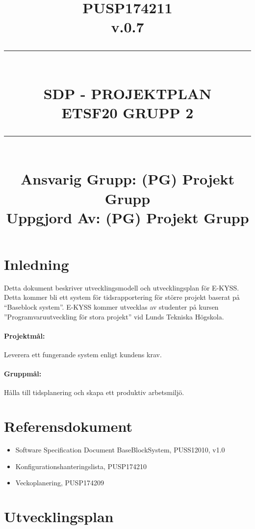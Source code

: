 \documentclass[paper=a4, fontsize=11pt,twoside]{article}
\title{
		\documentNumber{#1}																						
		\documentVersion{#2}																				
		\HRule{0.5pt} \\ %
		\LARGE \textbf{\uppercase{#3}} \\
		\large \textbf{\uppercase{ETSF20 Grupp 2}} 
		\HRule{2pt} \\ [1.5cm]    
		\normalsize            
		\documentResponsible{#4} \\ 
		\documentCreator{#4}  
	}
\newcommand{\HRule}[1]{\rule{\linewidth}{#1}}
\newcommand{\documentNumber}[1]{\centering PUSP1742#1 \\[1.0cm]}
\newcommand{\documentVersion}[1]{\centering \small{v.#1} \\[1.0cm]}
\newcommand{\documentResponsible}[1]{\centering  Ansvarig Grupp: #1}
\newcommand{\documentCreator}[1]{\centering Uppgjord Av: #1}
\newcommand{\grouptitlepage}[4]{ 
	\title{
		\documentNumber{#1}																						
		\documentVersion{#2}																				
		\HRule{0.5pt} \\ %
		\LARGE \textbf{\uppercase{#3}} \\
		\large \textbf{\uppercase{ETSF20 Grupp 2}} 
		\HRule{2pt} \\ [1.5cm]    
		\normalsize            
		\documentResponsible{#4} \\ 
		\documentCreator{#4}  
	}																							
	\maketitle																							
	\thispagestyle{empty} 																					
	\newpage 
}
\begin{document}
\grouptitlepage
{11}
{0.7}
{SDP - Projektplan}
{(PG) Projekt Grupp}	
\tableofcontents
\section{Inledning}
Detta dokument beskriver utvecklingsmodell och utvecklingsplan för E-KYSS. Detta kommer bli ett system för tidsrapportering för större projekt baserat på ``Baseblock system''. E-KYSS kommer utvecklas av studenter på kursen ''Programvaruutveckling för stora projekt'' vid Lunds Tekniska Högskola.
\paragraph{Projektmål:} Leverera ett fungerande system enligt kundens krav.
\paragraph{Gruppmål:} Hålla till tidsplanering och skapa ett produktiv arbetsmiljö.

\section{Referensdokument}
\begin{itemize}
\item Software Specification Document BaseBlockSystem, PUSS12010, v1.0
\item Konfigurationshanteringslista, PUSP174210
\item Veckoplanering, PUSP174209 
\end{itemize}
\section{Utvecklingsplan}
\end{document}
